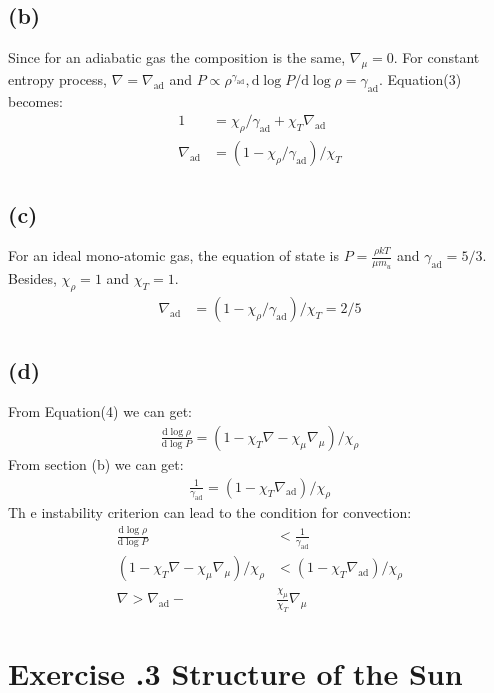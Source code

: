\documentclass[a4paper,12pt]{article}
\renewcommand{\d}{\mathrm{d}}
\begin{document}
\subsection*{(b)}
Since for an adiabatic gas the composition is the same, $\nabla_\mu = 0$. 
For constant entropy process, $\nabla = \nabla_\text{ad}$ and $P\propto \rho^{\gamma_{\text{ad}}}, \d \log P/\d \log \rho = \gamma_\text{ad}$.
Equation(3) becomes:
\begin{align*}
    1 &= \chi_\rho / \gamma_\text{ad} + \chi_T \nabla_\text{ad} \\
    \nabla_\text{ad} &= (1-\chi_\rho / \gamma_\text{ad})/\chi_T
\end{align*}

\subsection*{(c)}
For an ideal mono-atomic gas, the equation of state is $P = \frac{\rho kT}{\mu m_u}$ and $\gamma_\text{ad} = 5/3$. Besides, 
$\chi_\rho = 1$ and $\chi_T = 1$.
\begin{align*}
    \nabla_\text{ad} &= (1-\chi_\rho / \gamma_\text{ad})/\chi_T = 2/5
\end{align*}

\subsection*{(d)}
From Equation(4) we can get:
\begin{align*}
    \frac{\d \log \rho}{\d \log P} = (1 - \chi_T \nabla - \chi_\mu \nabla_\mu)/\chi_\rho
\end{align*}
From section (b) we can get:
\begin{align*}
    \frac{1}{\gamma_\text{ad}} = (1 - \chi_T \nabla_\text{ad})/\chi_\rho
\end{align*}
Th e instability criterion can lead to the condition for convection:
\begin{align*}
    \frac{\d \log \rho}{\d \log P} &< \frac{1}{\gamma_\text{ad}} \\
    (1 - \chi_T \nabla - \chi_\mu \nabla_\mu)/\chi_\rho &< (1 - \chi_T \nabla_\text{ad})/\chi_\rho \\
    \nabla > \nabla_\text{ad} -& \frac{\chi_\mu}{\chi_T}\nabla_\mu
\end{align*}



\section*{\textbf{Exercise \uppercase\expandafter{}.3 Structure of the Sun}}
\end{document}
